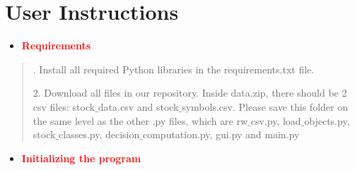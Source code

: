 \documentclass[fontsize=12pt]{article}
\begin{document}
\section*{User Instructions}
\begin{itemize}
\item
\textbf{\textcolor{red}{Requirements}}
\end{itemize}
\begin{quote}
. Install all required Python libraries in the requirements.txt file.

2. Download all files in our repository. Inside data.zip, there should be 2 csv files: stock$\_$data.csv and stock$\_$symbols.csv. Please save this folder on the same level as the other .py files, which are rw$\_$csv.py, load$\_$objects.py, stock$\_$classes.py, decision$\_$computation.py, gui.py and main.py
\end{quote}
\begin{itemize}
\item
\textbf{\textcolor{red}{Initializing the program}}
\end{itemize}
\end{document}
